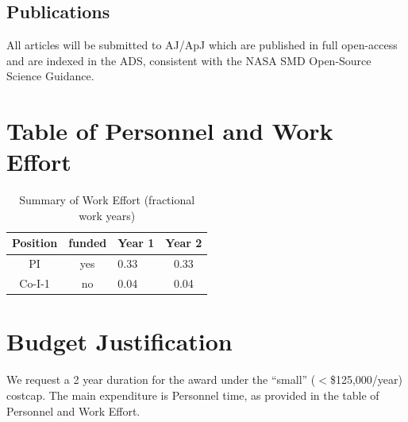 \documentclass[fleqn,12pt,onecolumn]{SelfArx} %
\begin{document}
\subsection{Publications}
All articles will be submitted to AJ/ApJ which are published in full open-access and are indexed in the ADS, consistent with the NASA SMD Open-Source Science Guidance.




\newpage
\section{Table of Personnel and Work Effort}

\begin{table}[htb]\small
    \centering
    \caption{Summary of Work Effort (fractional work years)}  \label{tbl:workeffort}
    \begin{tabular}{cclc}\\\hline%
      \multicolumn{1}{c}{Position}&
      \multicolumn{1}{c}{funded}&
      \multicolumn{1}{c}{Year 1}&
      \multicolumn{1}{c}{Year 2}\\\hline
      PI& yes &
      0.33&    0.33\\
      Co-I-1& no &
      0.04 & 0.04\\
    \end{tabular}
  \end{table}

\newpage
\section{Budget Justification}
We request a 2 year duration for the award under the ``small'' ($<$\$125,000/year) costcap. The main expenditure is Personnel time, as provided in the table of Personnel and Work Effort.
\end{document}

